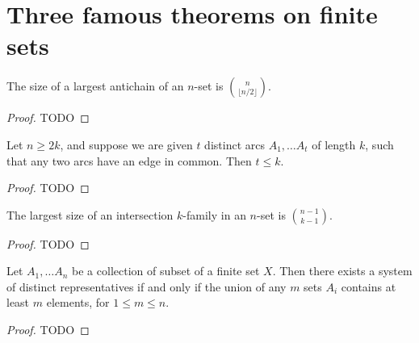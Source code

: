 \chapter{Three famous theorems on finite sets}

\begin{theorem}
  \label{ch30theorem1}
  The size of a largest antichain of an $n$-set is $\binom{n}{\lfloor n/2\rfloor}$.
\end{theorem}
\begin{proof}
  TODO
\end{proof}

\begin{lemma}
  \label{ch30lemma}
  Let $n \ge 2k$, and suppose we are given $t$ distinct arcs $A_1, \dots A_t$
  of length $k$, such that any two arcs have an edge in common. Then $t \le k$.
\end{lemma}
\begin{proof}
  TODO
\end{proof}

\begin{theorem}
  \label{ch30theorem2}
  The largest size of an intersection $k$-family in an $n$-set is $\binom{n - 1}{k - 1}$.
\end{theorem}
\begin{proof}
  TODO
\end{proof}

\begin{theorem}
  \label{ch30theorem3}
  Let  $A_1, \dots A_n$ be a collection of subset of a finite set $X$.
  Then there exists a system of distinct representatives if and only if the union of any $m$
  sets $A_i$ contains at least $m$ elements, for $1 \le m \le n$.
\end{theorem}
\begin{proof}
  TODO
\end{proof}
